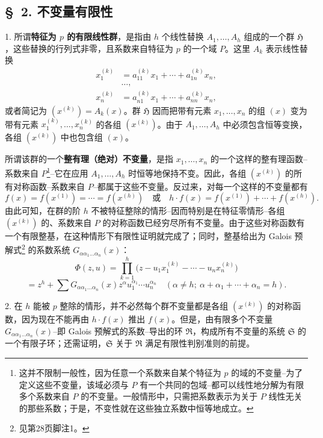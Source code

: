 \subsection*{\S\ 2. 不变量有限性}

1. 所谓\textbf{特征为 $p$ 的有限线性群}，是指由 $h$ 个线性替换 $A_1,\ldots,A_h$ 组成的一个群 $\mathfrak H$，这些替换的行列式非零，且系数来自特征为 $p$ 的一个域 $P$。这里 $A_k$ 表示线性替换
\[
\begin{aligned}
 x_1^{(k)}&=a_{11}^{(k)}x_1+\cdots+a_{1n}^{(k)}x_n,\\[-0.2em]
 &\ldots,\\[-0.2em]
 x_n^{(k)}&=a_{n1}^{(k)}x_1+\cdots+a_{nn}^{(k)}x_n,
\end{aligned}
\]
或者简记为 $(x^{(k)})=A_k(x)$。群 $\mathfrak H$ 因而把带有元素 $x_1,\ldots,x_n$ 的组 $(x)$ 变为带有元素 $x_1^{(k)},\ldots,x_n^{(k)}$ 的各组 $(x^{(k)})$。由于 $A_1,\ldots,A_h$ 中必须包含恒等变换，各组 $(x^{(k)})$ 中也包含组 $(x)$。

所谓该群的一个\textbf{整有理（绝对）不变量}，是指 $x_1,\ldots,x_n$ 的一个这样的整有理函数--系数来自 $P$\footnote{这并不限制一般性，因为任意一个系数来自某个特征为 $p$ 的域的不变量--为了定义这些不变量，该域必须与 $P$ 有一个共同的包域--都可以线性地分解为有限多个系数来自 $P$ 的不变量。一般情形中，只需把系数表示为关于 $P$ 线性无关的那些系数；于是，不变性就在这些独立系数中恒等地成立。}--它在应用 $A_1,\ldots,A_h$ 时恒等地保持不变。因此，各组 $(x^{(k)})$ 的所有对称函数--系数来自 $P$--都属于这些不变量。反过来，对每一个这样的不变量都有
\[
 f(x)=f(x^{(1)})=\cdots=f(x^{(h)})
 \quad\text{或}\quad
 h\cdot f(x)=f(x^{(1)})+\cdots+f(x^{(h)}).
\]
由此可知，在群的阶 $h$ 不被特征整除的情形--因而特别是在特征零情形--各组 $(x^{(k)})$ 的、系数来自 $P$ 的对称函数已经穷尽所有不变量。由于这些对称函数有一个有限整基，在这种情形下有限性证明就完成了；同时，整基给出为 Galois 预解式\footnote{见第28页脚注1。} 的系数系统 $G_{\alpha\alpha_1\ldots\alpha_n}(x)$：
\[
 \Phi(z,u)=\prod_{k=1}^{h}\bigl(z-u_1x_1^{(k)}-\cdots-u_nx_n^{(k)}\bigr)
\]
\[
 =z^h+\sum G_{\alpha\alpha_1\ldots\alpha_n}(x)
 z^{\alpha}u_1^{\alpha_1}\cdots u_n^{\alpha_n}
 \quad(\alpha\ne h;\ \alpha+\alpha_1+\cdots+\alpha_n=h).
\]

2. 在 $h$ 能被 $p$ 整除的情形，并不必然每个群不变量都是各组 $(x^{(k)})$ 的对称函数，因为现在不能再由 $h\cdot f(x)$ 推出 $f(x)$。但是，由有限多个不变量 $G_{\alpha\alpha_1\ldots\alpha_n}(x)$--即 Galois 预解式的系数--导出的环 $\mathfrak R$，构成所有不变量的系统 $\mathfrak S$ 的一个有限子环；还需证明，$\mathfrak S$ 关于 $\mathfrak R$ 满足有限性判别准则的前提。


